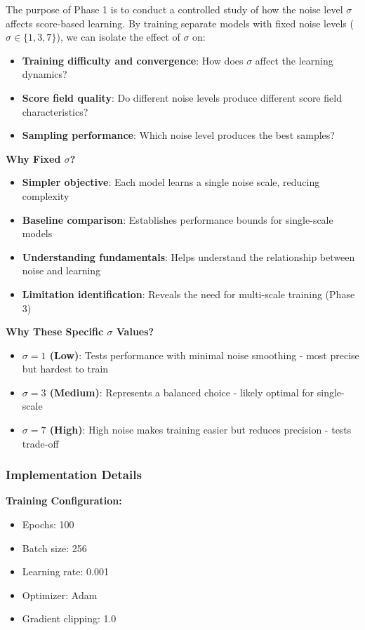 \documentclass[journal]{IEEEtran}
\begin{document}
The purpose of Phase 1 is to conduct a controlled study of how the noise level $\sigma$ affects score-based learning. By training separate models with fixed noise levels ($\sigma \in \{1, 3, 7\}$), we can isolate the effect of $\sigma$ on:

\begin{itemize}
    \item \textbf{Training difficulty and convergence}: How does $\sigma$ affect the learning dynamics?
    \item \textbf{Score field quality}: Do different noise levels produce different score field characteristics?
    \item \textbf{Sampling performance}: Which noise level produces the best samples?
\end{itemize}

\textbf{Why Fixed $\sigma$?}
\begin{itemize}
    \item \textbf{Simpler objective}: Each model learns a single noise scale, reducing complexity
    \item \textbf{Baseline comparison}: Establishes performance bounds for single-scale models
    \item \textbf{Understanding fundamentals}: Helps understand the relationship between noise and learning
    \item \textbf{Limitation identification}: Reveals the need for multi-scale training (Phase 3)
\end{itemize}

\textbf{Why These Specific $\sigma$ Values?}
\begin{itemize}
    \item \textbf{$\sigma = 1$ (Low)}: Tests performance with minimal noise smoothing - most precise but hardest to train
    \item \textbf{$\sigma = 3$ (Medium)}: Represents a balanced choice - likely optimal for single-scale
    \item \textbf{$\sigma = 7$ (High)}: High noise makes training easier but reduces precision - tests trade-off
\end{itemize}

\subsubsection{Implementation Details}

\textbf{Training Configuration:}
\begin{itemize}
    \item Epochs: 100
    \item Batch size: 256
    \item Learning rate: 0.001
    \item Optimizer: Adam
    \item Gradient clipping: 1.0
\end{itemize}
\end{document}
